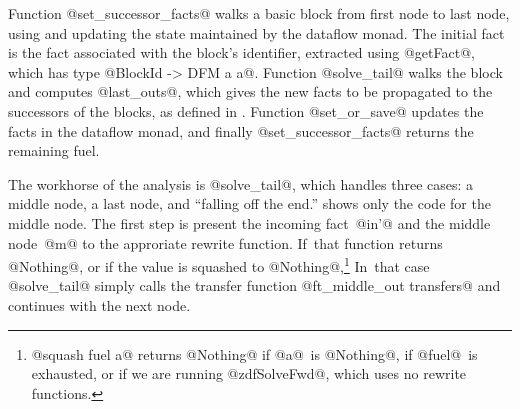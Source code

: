Function @set_successor_facts@ walks a basic block from first node to
last node, using and updating the state maintained by
the dataflow monad.
The initial fact is the fact associated with the block's identifier,
extracted using @getFact@, which has type @BlockId -> DFM a a@.
Function @solve_tail@ walks the block and computes @last_outs@, which
gives the new facts to be propagated to the successors of the blocks,
as defined in .
Function @set_or_save@ updates the facts in the dataflow monad,
and finally @set_successor_facts@ returns the remaining fuel.

The workhorse of the analysis is @solve_tail@, which handles three
cases: a middle node, a last node, and ``falling off the end.''
 shows only the code for the middle node.
The first step is present the incoming fact~@in'@ and the middle
node~@m@ to the approriate rewrite function.
If~that function returns @Nothing@, or if the value is squashed to
@Nothing@,\footnote
{@squash fuel a@ returns @Nothing@ if @a@~is @Nothing@, if @fuel@~is
  exhausted, or if we are running @zdfSolveFwd@, which uses no rewrite
  functions.
}
In~that case @solve_tail@ simply calls the transfer function
@ft_middle_out transfers@ and continues with the next node.




